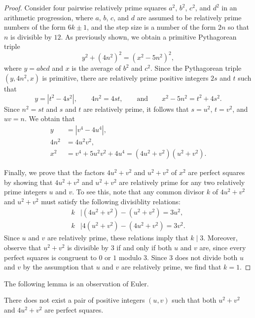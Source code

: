 \begin{proof}
  Consider four pairwise relatively prime squares $a^2$, $b^2$, $c^2$, and $d^2$ in an arithmetic progression, where $a$, $b$, $c$, and $d$ are assumed to be relatively prime numbers of the form $6k\pm 1$, and the step size is a number of the form $2n$ so that $n$ is divisible by $12$. As previously shown, we obtain a primitive Pythagorean triple
  \begin{equation*}
    y^2+(4n^2)^2=(x^2-5n^2)^2,
  \end{equation*}
  where $y=abcd$ and $x$ is the average of $b^2$ and $c^2$.
  Since the Pythagorean triple $(y,4n^2,x)$ is primitive, there are relatively prime positive integers $2s$ and $t$ such that
  \begin{equation*}
    y=|t^2-4s^2|,\qquad 4n^2=4st,\qquad\text{and}\qquad x^2-5n^2=t^2+4s^2.
  \end{equation*}
  Since $n^2=st$ and $s$ and $t$ are relatively prime, it follows that $s=u^2$, $t=v^2$, and $uv=n$. We obtain that
  \begin{align*}
       y & =|v^4-4u^4|, \\
    4n^2 & =4u^2v^2, \\
     x^2 & =v^4+5u^2v^2+4u^4=(4u^2+v^2)(u^2+v^2).
  \end{align*}

  Finally, we prove that the factors $4u^2+v^2$ and $u^2+v^2$ of $x^2$ are perfect squares by showing that $4u^2+v^2$ and $u^2+v^2$ are relatively prime for any two relatively prime integers $u$ and $v$. To see this, note that any common divisor $k$ of $4u^2+v^2$ and $u^2+v^2$ must satisfy the following divisiblity relations:
  \begin{align*}
    k & \mid (4u^2+v^2) - (u^2+v^2) = 3u^2, \\
    k & \mid 4(u^2+v^2)-(4u^2+v^2) = 3v^2.
  \end{align*}
  Since $u$ and $v$ are relatively prime, these relations imply that $k\mid 3$. Moreover, observe that $u^2+v^2$ is divisible by $3$ if and only if both $u$ and $v$ are, since every perfect squares is congruent to $0$ or $1$ modulo $3$. Since $3$ does not divide both $u$ and $v$ by the assumption that $u$ and $v$ are relatively prime, we find that $k=1$.
\end{proof}

The following lemma is an observation of Euler.

\begin{lemma}\label{lemma:fermat-euler}
  There does not exist a pair of positive integers $(u,v)$ such that both $u^2+v^2$ and $4u^2+v^2$ are perfect squares.
\end{lemma}

